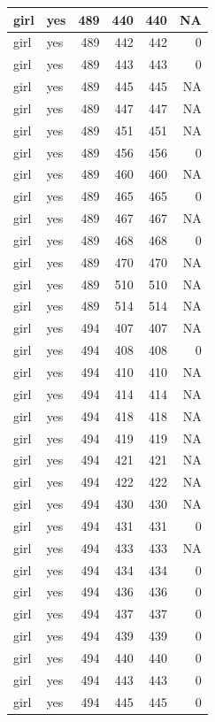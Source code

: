 \documentclass[man]{apa6}
\begin{document}
\begin{tabular}{l|l|r|r|r|r}
\hline
girl & yes & 489 & 440 & 440 & NA\\
\hline
girl & yes & 489 & 442 & 442 & 0\\
\hline
girl & yes & 489 & 443 & 443 & 0\\
\hline
girl & yes & 489 & 445 & 445 & NA\\
\hline
girl & yes & 489 & 447 & 447 & NA\\
\hline
girl & yes & 489 & 451 & 451 & NA\\
\hline
girl & yes & 489 & 456 & 456 & 0\\
\hline
girl & yes & 489 & 460 & 460 & NA\\
\hline
girl & yes & 489 & 465 & 465 & 0\\
\hline
girl & yes & 489 & 467 & 467 & NA\\
\hline
girl & yes & 489 & 468 & 468 & 0\\
\hline
girl & yes & 489 & 470 & 470 & NA\\
\hline
girl & yes & 489 & 510 & 510 & NA\\
\hline
girl & yes & 489 & 514 & 514 & NA\\
\hline
girl & yes & 494 & 407 & 407 & NA\\
\hline
girl & yes & 494 & 408 & 408 & 0\\
\hline
girl & yes & 494 & 410 & 410 & NA\\
\hline
girl & yes & 494 & 414 & 414 & NA\\
\hline
girl & yes & 494 & 418 & 418 & NA\\
\hline
girl & yes & 494 & 419 & 419 & NA\\
\hline
girl & yes & 494 & 421 & 421 & NA\\
\hline
girl & yes & 494 & 422 & 422 & NA\\
\hline
girl & yes & 494 & 430 & 430 & NA\\
\hline
girl & yes & 494 & 431 & 431 & 0\\
\hline
girl & yes & 494 & 433 & 433 & NA\\
\hline
girl & yes & 494 & 434 & 434 & 0\\
\hline
girl & yes & 494 & 436 & 436 & 0\\
\hline
girl & yes & 494 & 437 & 437 & 0\\
\hline
girl & yes & 494 & 439 & 439 & 0\\
\hline
girl & yes & 494 & 440 & 440 & 0\\
\hline
girl & yes & 494 & 443 & 443 & 0\\
\hline
girl & yes & 494 & 445 & 445 & 0\\

\end{tabular}
\end{document}
